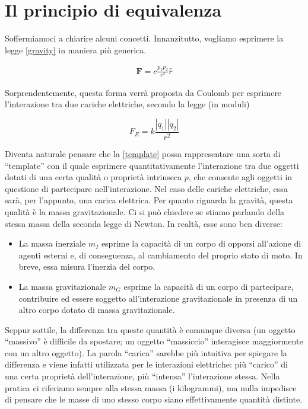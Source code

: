 \section{Il principio di equivalenza}
Soffermiamoci a chiarire alcuni concetti. Innanzitutto, vogliamo esprimere la legge
\ref{gravity} in maniera più generica.

\begin{align}
    \mathbf{F} = c\frac{p_1p_2}{r^2}\hat{r} \label{template}
\end{align}

\noindent Sorprendentemente, questa forma verrà proposta da Coulomb per esprimere
l'interazione tra due cariche elettriche, secondo la legge (in moduli)

\[ F_E = k\frac{|q_1||q_2|}{r^2} \]

\noindent Diventa naturale pensare che la \ref{template} possa rappresentare una
sorta di ``template'' con il quale esprimere quantitativamente l'interazione tra due
oggetti dotati di una certa qualità o proprietà intrinseca $p$, che consente agli oggetti in
questione di partecipare nell'interazione. Nel caso delle cariche elettriche,
essa sarà, per l'appunto, una carica elettrica. Per quanto riguarda la gravità,
questa qualità è la massa gravitazionale. Ci si può chiedere se stiamo parlando
della stessa massa della seconda legge di Newton. In realtà, esse sono ben diverse:
\begin{itemize}
    \item La massa inerziale $m_I$ esprime la capacità di un corpo di opporsi all'azione
    di agenti esterni e, di conseguenza, al cambiamento del proprio stato di moto.
    In breve, essa misura l'inerzia del corpo.

    \item La massa gravitazionale $m_G$ esprime la capacità di un corpo di partecipare,
    contribuire ed essere soggetto all'interazione gravitazionale in presenza di
    un altro corpo dotato di massa gravitazionale.
\end{itemize}
Seppur sottile, la differenza tra queste quantità è
comunque diversa (un oggetto ``massivo'' è difficile da spostare; un oggetto ``massiccio''
interagisce maggiormente con un altro oggetto). La parola ``carica'' sarebbe più intuitiva per spiegare la differenza
e viene infatti utilizzata per le interazioni elettriche: più ``carico'' di una certa
proprietà dell'interazione, più ``intensa'' l'interazione stessa. Nella pratica ci
riferiamo sempre alla stessa massa (i kilogrammi), ma nulla impedisce di pensare che le masse di
uno stesso corpo siano effettivamente quantità distinte.

